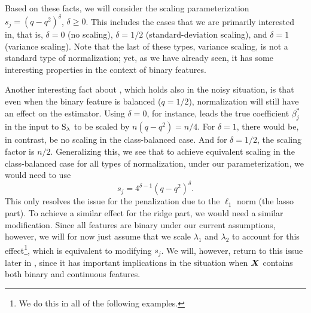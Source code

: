 Based on these facts, we will consider the scaling parameterization \(s_j = (q-q^2)^\delta\), \(\delta \geq 0\). This includes the cases that we are primarily interested in, that is,
\(\delta = 0\) (no scaling), \(\delta = 1/2\) (standard-deviation scaling), and \(\delta = 1\) (variance scaling). Note that the last of these types, variance scaling, is not a standard type of normalization; yet, as we have already seen, it has some interesting properties
in the context of binary features.

Another interesting fact about , which holds also in the noisy situation, is that even when the binary feature is balanced (\(q = 1/2\)), normalization will still have an effect on the estimator.
Using \(\delta = 0\), for instance, leads the true coefficient \(\beta_j^*\) in the input to \(\operatorname{S}_\lambda\) to be scaled by \(n (q - q^2) = n/4\). For \(\delta = 1\), there would be, in contrast, be no scaling in the class-balanced case. And for \(\delta = 1/2\), the scaling factor is \(n/2\). Generalizing this, we see that to achieve equivalent scaling in the class-balanced case for all types of normalization, under our parameterization, we would need to use
\[
  s_j = 4^{\delta - 1} (q - q^2)^\delta.
\]
This only resolves the issue for the penalization due to the \(\ell_1\) norm (the lasso part).
To achieve a similar effect for the ridge part, we would need a similar modification.
Since all features are binary under our current assumptions, however, we will for now just assume that we scale \(\lambda_1\) and \(\lambda_2\) to account for this effect\footnote{We do this in all of the following examples.}, which is equivalent to modifying \(s_j\). We will, however, return to this issue later in , since it has important implications in the situation when \(\boldsymbol{X}\) contains both binary and continuous features.


